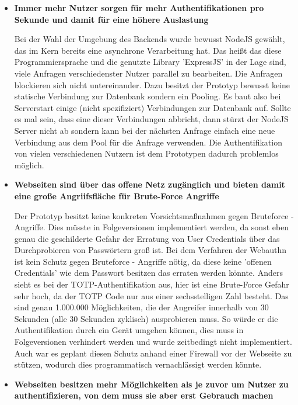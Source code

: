 \begin{itemize}
\item \textbf{Immer mehr Nutzer sorgen für mehr Authentifikationen pro Sekunde und damit für eine höhere Auslastung}

Bei der Wahl der Umgebung des Backends wurde bewusst NodeJS gewählt, das im Kern bereits eine asynchrone Verarbeitung hat. Das heißt das diese Programmiersprache und die genutzte Library 'ExpressJS' in der Lage sind, viele Anfragen verschiedenster Nutzer parallel zu bearbeiten. Die Anfragen blockieren sich nicht untereinander. Dazu besitzt der Prototyp bewusst keine statische Verbindung zur Datenbank sondern ein Pooling. Es baut also bei Serverstart einige (nicht spezifiziert) Verbindungen zur Datenbank auf. Sollte es mal sein, dass eine dieser Verbindungen abbricht, dann stürzt der NodeJS Server nicht ab sondern kann bei der nächsten Anfrage einfach eine neue Verbindung aus dem Pool für die Anfrage verwenden. Die Authentifikation von vielen verschiedenen Nutzern ist dem Prototypen dadurch problemlos möglich.

\item \textbf{Webseiten sind über das offene Netz zugänglich und bieten damit eine große Angriifsfläche für Brute-Force Angriffe}

Der Prototyp besitzt keine konkreten Vorsichtsmaßnahmen gegen Bruteforce - Angriffe. Dies müsste in Folgeversionen implementiert werden, da sonst eben genau die geschilderte Gefahr der Erratung von User Credentials über das Durchprobieren von Passwörtern groß ist. Bei dem Verfahren der Webauthn ist kein Schutz gegen Bruteforce - Angriffe nötig, da diese keine 'offenen Credentials' wie dem Passwort besitzen das erraten werden könnte. Anders sieht es bei der TOTP-Authentifikation aus, hier ist eine Brute-Force Gefahr sehr hoch, da der TOTP Code nur aus einer sechsstelligen Zahl besteht. Das sind genau 1.000.000 Möglichkeiten, die der Angreifer innerhalb von 30 Sekunden (alle 30 Sekunden zyklisch) ausprobieren muss. So würde er die Authentifikation durch ein Gerät umgehen können, dies muss in Folgeversionen verhindert werden und wurde zeitbedingt nicht implementiert. Auch war es geplant diesen Schutz anhand einer Firewall vor der Webseite zu stützen, wodurch dies programmatisch vernachlässigt werden könnte.

\item \textbf{Webseiten besitzen mehr Möglichkeiten als je zuvor um Nutzer zu authentifizieren, von dem muss sie aber erst Gebrauch machen}


\end{itemize}

